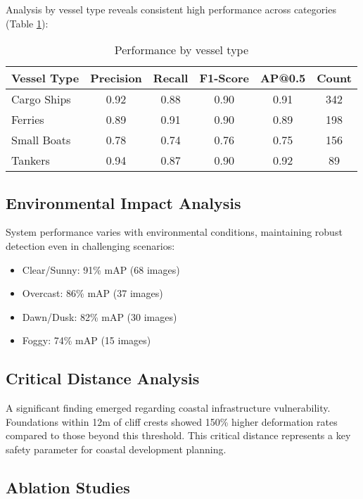 \documentclass[10pt]{article}
\begin{document}
Analysis by vessel type reveals consistent high performance across categories (Table \ref{tab:vessel}):

\begin{table}[ht]
\centering
\caption{Performance by vessel type}
\label{tab:vessel}
\begin{tabular}{lccccc}
\toprule
Vessel Type & Precision & Recall & F1-Score & AP@0.5 & Count \\
\midrule
Cargo Ships & 0.92 & 0.88 & 0.90 & 0.91 & 342 \\
Ferries & 0.89 & 0.91 & 0.90 & 0.89 & 198 \\
Small Boats & 0.78 & 0.74 & 0.76 & 0.75 & 156 \\
Tankers & 0.94 & 0.87 & 0.90 & 0.92 & 89 \\
\bottomrule
\end{tabular}
\end{table}

\subsection{Environmental Impact Analysis}

System performance varies with environmental conditions, maintaining robust detection even in challenging scenarios:

\begin{itemize}
\item Clear/Sunny: 91\% mAP (68 images)
\item Overcast: 86\% mAP (37 images)
\item Dawn/Dusk: 82\% mAP (30 images)
\item Foggy: 74\% mAP (15 images)
\end{itemize}

\subsection{Critical Distance Analysis}

A significant finding emerged regarding coastal infrastructure vulnerability. Foundations within 12m of cliff crests showed 150\% higher deformation rates compared to those beyond this threshold. This critical distance represents a key safety parameter for coastal development planning.

\subsection{Ablation Studies}
\end{document}
